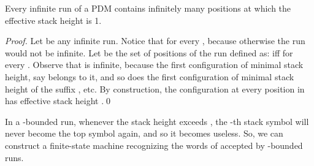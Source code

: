 \documentclass{llncs}
\begin{document}
\begin{proposition}\label{prop:esh1often}
Every infinite run of a PDM contains infinitely many positions at which the
effective stack height is 1.
\end{proposition}
 \begin{proof}
 Let  be any infinite run. 
 Notice that  for every , because otherwise the run would not
 be infinite. Let  be the set of positions of the run defined as:
  if{}f  for every . Observe that
  is infinite, because the first configuration of minimal stack height,
 say  belongs to it, and so does the first configuration of minimal stack height
 of the suffix , etc.
 By construction, the configuration at every position in  has effective stack height .\qed
 \end{proof}

In a -bounded run, whenever
the stack height exceeds , the -th stack symbol will never become the top symbol
again, and so it becomes useless. 
So, we can construct a finite-state machine  recognizing the words of 
accepted by -bounded runs. 
\end{document}
